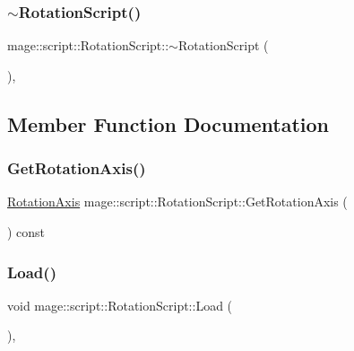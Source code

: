 \subsubsection{\texorpdfstring{$\sim$\+Rotation\+Script()}{~RotationScript()}}
{\footnotesize\ttfamily mage\+::script\+::\+Rotation\+Script\+::$\sim$\+Rotation\+Script (\begin{DoxyParamCaption}{ }\end{DoxyParamCaption})\hspace{0.3cm}{\ttfamily [virtual]}, {\ttfamily [default]}}



\subsection{Member Function Documentation}
\hypertarget{classmage_1_1script_1_1_rotation_script_ac2ef46249d59b379f47336eb250f3a28}{}\label{classmage_1_1script_1_1_rotation_script_ac2ef46249d59b379f47336eb250f3a28} 
\subsubsection{\texorpdfstring{Get\+Rotation\+Axis()}{GetRotationAxis()}}
{\footnotesize\ttfamily \hyperlink{classmage_1_1script_1_1_rotation_script_aa8a91cc8c771fc777ffb5e8a28c43ad2}{Rotation\+Axis} mage\+::script\+::\+Rotation\+Script\+::\+Get\+Rotation\+Axis (\begin{DoxyParamCaption}{ }\end{DoxyParamCaption}) const\hspace{0.3cm}{\ttfamily [noexcept]}}

\hypertarget{classmage_1_1script_1_1_rotation_script_a7a632d323f57f4f2f19c0562bd0656e1}{}\label{classmage_1_1script_1_1_rotation_script_a7a632d323f57f4f2f19c0562bd0656e1} 
\subsubsection{\texorpdfstring{Load()}{Load()}}
{\footnotesize\ttfamily void mage\+::script\+::\+Rotation\+Script\+::\+Load (\begin{DoxyParamCaption}{ }\end{DoxyParamCaption})\hspace{0.3cm}{\ttfamily [override]}, {\ttfamily [virtual]}}

